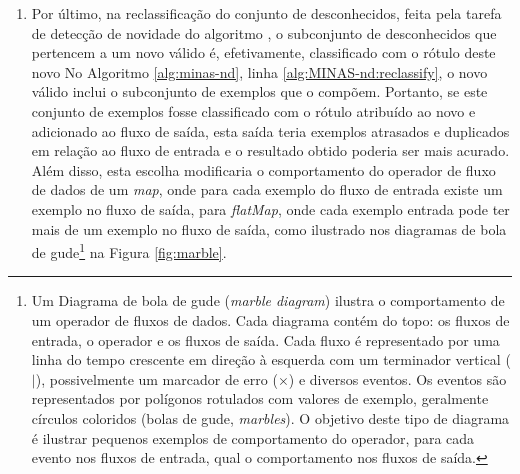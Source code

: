 \begin{enumerate}
  \item \label{reclassification}
  Por último, na reclassificação do conjunto de desconhecidos,
  feita pela tarefa de detecção de novidade do algoritmo \minas, o subconjunto de
  desconhecidos que pertencem a um novo \mcluster válido é, efetivamente,
  classificado com o rótulo deste novo \mcluster
  No Algoritmo \ref{alg:minas-nd}, linha \ref{alg:MINAS-nd:reclassify},
  o novo \mcluster válido inclui o subconjunto de exemplos que o compõem.
  Portanto, se este conjunto de exemplos fosse classificado com o rótulo atribuído ao
  novo \mcluster e adicionado ao fluxo de saída, esta saída teria exemplos
  atrasados e duplicados em relação ao fluxo de entrada e o resultado obtido
  poderia ser mais acurado.
  Além disso, esta escolha modificaria o comportamento do operador de fluxo de
  dados de um \emph{map}, onde para cada exemplo do fluxo de entrada existe um
  exemplo no fluxo de saída, para \emph{flatMap}, onde cada exemplo entrada pode
  ter mais de um exemplo no fluxo de saída, como ilustrado nos 
  diagramas de bola de gude\footnote{
  Um Diagrama de bola de gude (\emph{marble diagram}) ilustra o comportamento de
  um operador de fluxos de dados.
  Cada diagrama contém do topo: os fluxos de entrada, o operador e os fluxos de saída.
  Cada fluxo é representado por uma linha do tempo crescente em direção à
  esquerda com um terminador vertical ($|$), possivelmente um marcador de erro
  ($\times$) e diversos eventos.
  Os eventos são representados por polígonos rotulados com valores de exemplo,
  geralmente círculos coloridos (bolas de gude, \emph{marbles}).
  O objetivo deste tipo de diagrama é ilustrar pequenos exemplos de comportamento
  do operador, para cada evento nos fluxos de entrada, qual o comportamento nos
  fluxos de saída.
  }
  na Figura \ref{fig:marble}.

\end{enumerate}

